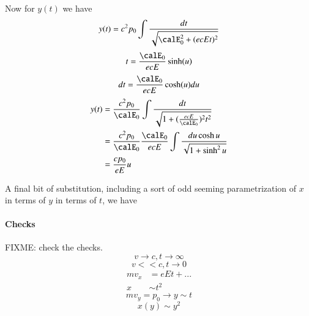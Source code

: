 {Now for \(y(t)\) we have
%
\begin{equation}\label{eqn:relativisticElectrodynamicsT3:340}
y(t) = c^2 p_0 \int \frac{dt}{ \sqrt{\calE_0^2 + (e c E t)^2 }}
\end{equation}
%
\begin{equation}\label{eqn:relativisticElectrodynamicsT3:360}
t = \frac{\calE_0}{ e c E} \sinh(u)
\end{equation}
%
\begin{equation}\label{eqn:relativisticElectrodynamicsT3:380}
dt = \frac{\calE_0}{ e c E} \cosh(u) du
\end{equation}
%
\begin{equation}\label{eqn:relativisticElectrodynamicsT3:970}
\begin{aligned}
y(t)
&= \frac{c^2 p_0}{\calE_0} \int \frac{dt}{\sqrt{1 + (\frac{e c E}{\calE_0})^2 t^2 }} \\
&= \frac{c^2 p_0}{\calE_0}
\frac{\calE_0}{ e c E}
\int \frac{ du \cosh u }{\sqrt{1 + \sinh^2 u }} \\
&= \frac{c p_0}{ e E} u
\end{aligned}
\end{equation}

A final bit of substitution, including a sort of odd seeming parametrization of \(x\) in terms of \(y\) in terms of \(t\), we have


\paragraph{Checks}

FIXME: check the checks.
%
\begin{equation}\label{eqn:relativisticElectrodynamicsT3:420}
v \rightarrow c, t \rightarrow \infty
\end{equation}
%
\begin{equation}\label{eqn:relativisticElectrodynamicsT3:440}
v << c, t \rightarrow 0
\end{equation}
%
\begin{equation}\label{eqn:relativisticElectrodynamicsT3:990}
\begin{aligned}
m v_x &= e E t + ... \\
x &\sim t^2
\end{aligned}
\end{equation}
%
\begin{equation}\label{eqn:relativisticElectrodynamicsT3:460}
m v_y = p_0 \rightarrow y \sim t
\end{equation}
%
\begin{equation}\label{eqn:relativisticElectrodynamicsT3:480}
x(y) \sim y^2
\end{equation}

}
